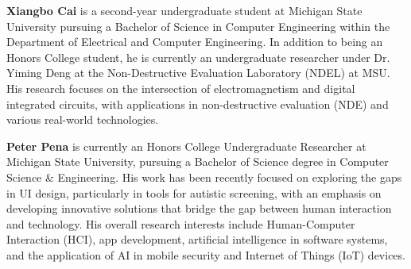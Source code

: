 \documentclass[conference]{IEEEtran}
\begin{document}
\textbf{Xiangbo Cai} is a second-year undergraduate student at Michigan State University pursuing a Bachelor of Science in Computer Engineering within the Department of Electrical and Computer Engineering. In addition to being an Honors College student, he is currently an undergraduate researcher under Dr. Yiming Deng at the Non-Destructive Evaluation Laboratory (NDEL) at MSU. His research focuses on the intersection of electromagnetism and digital integrated circuits, with applications in non-destructive evaluation (NDE) and various real-world technologies.

\vspace{1cm}

\textbf{Peter Pena} is currently an Honors College Undergraduate Researcher at Michigan State University, pursuing a Bachelor of Science degree in Computer Science \& Engineering. His work has been recently focused on exploring the gaps in UI design, particularly in tools for autistic screening, with an emphasis on developing innovative solutions that bridge the gap between human interaction and technology. His overall research interests include Human-Computer Interaction (HCI), app development, artificial intelligence in software systems, and the application of AI in mobile security and Internet of Things (IoT) devices.
\end{document}
